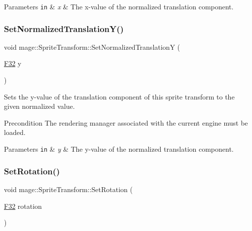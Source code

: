 \begin{DoxyParams}[1]{Parameters}
\mbox{\tt in}  & {\em x} & The x-\/value of the normalized translation component. \\
\hline
\end{DoxyParams}
\hypertarget{structmage_1_1_sprite_transform_aac384e3769b23e4452e6dd7b416146fa}{}\label{structmage_1_1_sprite_transform_aac384e3769b23e4452e6dd7b416146fa} 
\subsubsection{\texorpdfstring{Set\+Normalized\+Translation\+Y()}{SetNormalizedTranslationY()}}
{\footnotesize\ttfamily void mage\+::\+Sprite\+Transform\+::\+Set\+Normalized\+TranslationY (\begin{DoxyParamCaption}\item[{\hyperlink{namespacemage_aa97e833b45f06d60a0a9c4fc22ae02c0}{F32}}]{y }\end{DoxyParamCaption})}

Sets the y-\/value of the translation component of this sprite transform to the given normalized value.

\begin{DoxyPrecond}{Precondition}
The rendering manager associated with the current engine must be loaded. 
\end{DoxyPrecond}

\begin{DoxyParams}[1]{Parameters}
\mbox{\tt in}  & {\em y} & The y-\/value of the normalized translation component. \\
\hline
\end{DoxyParams}
\hypertarget{structmage_1_1_sprite_transform_aa5e9162146729dd579e2409e348eafa2}{}\label{structmage_1_1_sprite_transform_aa5e9162146729dd579e2409e348eafa2} 
\subsubsection{\texorpdfstring{Set\+Rotation()}{SetRotation()}}
{\footnotesize\ttfamily void mage\+::\+Sprite\+Transform\+::\+Set\+Rotation (\begin{DoxyParamCaption}\item[{\hyperlink{namespacemage_aa97e833b45f06d60a0a9c4fc22ae02c0}{F32}}]{rotation }\end{DoxyParamCaption})\hspace{0.3cm}{\ttfamily [noexcept]}}

